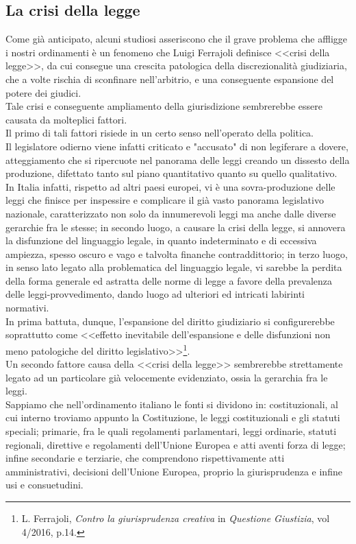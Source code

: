 \subsection{La crisi della legge}
Come già anticipato, alcuni studiosi asseriscono che il grave problema che affligge i nostri ordinamenti è un fenomeno che Luigi Ferrajoli definisce <<crisi della legge>>, da cui consegue una crescita patologica della discrezionalità giudiziaria, che a volte rischia di sconfinare nell’arbitrio, e una conseguente espansione del potere dei giudici.
\\Tale crisi e conseguente ampliamento della giurisdizione sembrerebbe essere causata da molteplici fattori.
\\Il primo di tali fattori risiede in un certo senso nell'operato della politica.
\\Il legislatore odierno viene infatti criticato e "accusato" di non legiferare a dovere, atteggiamento che si ripercuote nel panorama delle leggi creando un dissesto della produzione, difettato tanto sul piano quantitativo quanto su quello qualitativo. \\In Italia infatti, rispetto ad altri paesi europei, vi è una sovra-produzione delle leggi che finisce per inspessire e complicare il già vasto panorama legislativo nazionale, caratterizzato non solo da innumerevoli leggi ma anche dalle diverse gerarchie fra le stesse; in secondo luogo, a causare la crisi della legge, si annovera la disfunzione del linguaggio legale, in quanto indeterminato e di eccessiva ampiezza, spesso oscuro e vago e talvolta finanche contraddittorio; in terzo luogo, in senso lato legato alla problematica del linguaggio legale, vi sarebbe la perdita della forma generale ed astratta delle norme di legge a favore della prevalenza delle leggi-provvedimento, dando luogo ad ulteriori ed intricati labirinti normativi.
\\In prima battuta, dunque, l’espansione del diritto giudiziario si configurerebbe soprattutto come <<effetto inevitabile dell’espansione e delle disfunzioni non meno patologiche del diritto legislativo>>\footnote{L. Ferrajoli, \textit{Contro la giurisprudenza creativa} in \textit{Questione Giustizia}, vol 4/2016, p.14.}.
\\Un secondo fattore causa della <<crisi della legge>> sembrerebbe strettamente legato ad un particolare già velocemente evidenziato, ossia la gerarchia fra le leggi.
\\Sappiamo che nell'ordinamento italiano le fonti si dividono in: costituzionali, al cui interno troviamo appunto la Costituzione, le leggi costituzionali e gli statuti speciali; primarie, fra le quali regolamenti parlamentari, leggi ordinarie, statuti regionali, direttive e regolamenti dell'Unione Europea e atti aventi forza di legge; infine secondarie e terziarie, che comprendono rispettivamente atti amministrativi, decisioni dell'Unione Europea, proprio la giurisprudenza e infine usi e consuetudini.
